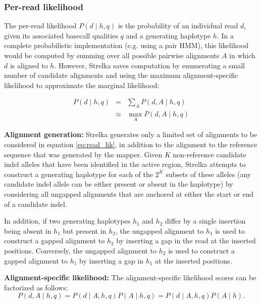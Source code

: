 \documentclass{article}
\begin{document}
\subsubsection{Per-read likelihood}
The per-read likelihood $P(d \mid h,q)$ is the probability of an individual read $d$, given its associated basecall qualities $q$ and a generating haplotype $h$. In a complete probabilistic implementation (e.g. using a pair HMM), this likelihood would be computed by summing over all possible pairwise alignments $A$ in which $d$ is aligned to $h$. However, Strelka saves computation by enumerating a small number of candidate alignments and using the maximum alignment-specific likelihood to approximate the marginal likelihood:

\begin{eqnarray}
\label{eq:read_lik}
P(d \mid h,q) & = & \sum_A P(d,A \mid h,q)\\
& \approx & \max_A P(d,A \mid h,q)
\end{eqnarray}

{\bf Alignment generation:}
Strelka generates only a limited set of alignments to be considered in equation \ref{eq:read_lik}, in addition to the alignment to the reference sequence that was generated by the mapper. Given $K$ non-reference candidate indel alleles that have been identified in the active region, Strelka attempts to construct a generating haplotype for each of the $2^K$ subsets of these alleles (any candidate indel allele can be either present or absent in the haplotype) by considering all ungapped alignments that are anchored at either the start or end of a candidate indel.

In addition, if two generating haplotypes $h_1$ and $h_2$ differ by a single insertion being absent in $h_1$ but present in $h_2$, the ungapped alignment to $h_1$ is used to construct a gapped alignment to $h_2$ by inserting a gap in the read at the inserted positions. Conversely, the ungapped alignment to $h_2$ is used to construct a gapped alignment to $h_1$ by inserting a gap in $h_1$ at the inserted positions.

{\bf Alignment-specific likelihood:}
The alignment-specific likelihood scores can be factorized as follows:
\begin{equation}
\label{eq:al_lik}
P(d,A \mid h,q) = P(d \mid A,h,q)P(A \mid h,q) = P(d \mid A,h,q)P(A \mid h).
\end{equation}
\end{document}
